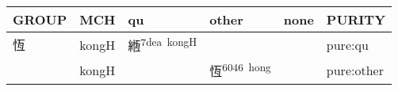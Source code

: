 \documentclass[14pt,a4paper]{scrartcl}
\begin{document}
\begin{longtable}[c]{@{}llllll@{}}
\toprule
\begin{minipage}[b]{0.14\columnwidth}\raggedright\strut
GROUP
\strut\end{minipage} &
\begin{minipage}[b]{0.14\columnwidth}\raggedright\strut
MCH
\strut\end{minipage} &
\begin{minipage}[b]{0.14\columnwidth}\raggedright\strut
qu
\strut\end{minipage} &
\begin{minipage}[b]{0.14\columnwidth}\raggedright\strut
other
\strut\end{minipage} &
\begin{minipage}[b]{0.14\columnwidth}\raggedright\strut
none
\strut\end{minipage} &
\begin{minipage}[b]{0.14\columnwidth}\raggedright\strut
PURITY
\strut\end{minipage}\tabularnewline
\midrule
\endhead
\begin{minipage}[t]{0.14\columnwidth}\raggedright\strut
恆
\strut\end{minipage} &
\begin{minipage}[t]{0.14\columnwidth}\raggedright\strut
kongH
\strut\end{minipage} &
\begin{minipage}[t]{0.14\columnwidth}\raggedright\strut
緪\textsuperscript{7dea~kongH}
\strut\end{minipage} &
\begin{minipage}[t]{0.14\columnwidth}\raggedright\strut
\strut\end{minipage} &
\begin{minipage}[t]{0.14\columnwidth}\raggedright\strut
\strut\end{minipage} &
\begin{minipage}[t]{0.14\columnwidth}\raggedright\strut
pure:qu
\strut\end{minipage}\tabularnewline
\begin{minipage}[t]{0.14\columnwidth}\raggedright\strut
𢛢
\strut\end{minipage} &
\begin{minipage}[t]{0.14\columnwidth}\raggedright\strut
kongH
\strut\end{minipage} &
\begin{minipage}[t]{0.14\columnwidth}\raggedright\strut
\strut\end{minipage} &
\begin{minipage}[t]{0.14\columnwidth}\raggedright\strut
恆\textsuperscript{6046~hong}
\strut\end{minipage} &
\begin{minipage}[t]{0.14\columnwidth}\raggedright\strut
\strut\end{minipage} &
\begin{minipage}[t]{0.14\columnwidth}\raggedright\strut
pure:other
\strut\end{minipage}\tabularnewline
\bottomrule
\end{longtable}
\end{document}
